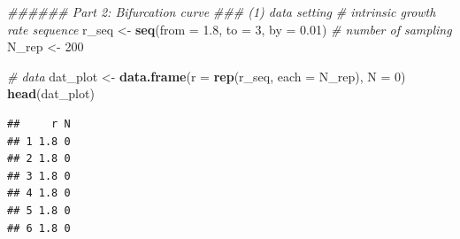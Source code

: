 \documentclass[
]{book}
\newenvironment{Shaded}{\begin{snugshade}}{\end{snugshade}}
\newcommand{\CommentTok}[1]{\textcolor[rgb]{0.56,0.35,0.01}{\textit{#1}}}
\newcommand{\DataTypeTok}[1]{\textcolor[rgb]{0.13,0.29,0.53}{#1}}
\newcommand{\DecValTok}[1]{\textcolor[rgb]{0.00,0.00,0.81}{#1}}
\newcommand{\FloatTok}[1]{\textcolor[rgb]{0.00,0.00,0.81}{#1}}
\newcommand{\KeywordTok}[1]{\textcolor[rgb]{0.13,0.29,0.53}{\textbf{#1}}}
\newcommand{\NormalTok}[1]{#1}
\newcommand{\StringTok}[1]{\textcolor[rgb]{0.31,0.60,0.02}{#1}}
\begin{document}
\begin{Shaded}
\begin{Highlighting}[]
\CommentTok{###### Part 2: Bifurcation curve}
\CommentTok{### (1) data setting}
\CommentTok{# intrinsic growth rate sequence}
\NormalTok{r_seq <-}\StringTok{ }\KeywordTok{seq}\NormalTok{(}\DataTypeTok{from =} \FloatTok{1.8}\NormalTok{, }\DataTypeTok{to =} \DecValTok{3}\NormalTok{, }\DataTypeTok{by =} \FloatTok{0.01}\NormalTok{)}
\CommentTok{# number of sampling}
\NormalTok{N_rep <-}\StringTok{ }\DecValTok{200}

\CommentTok{# data }
\NormalTok{dat_plot <-}\StringTok{ }\KeywordTok{data.frame}\NormalTok{(}\DataTypeTok{r =} \KeywordTok{rep}\NormalTok{(r_seq, }\DataTypeTok{each =}\NormalTok{ N_rep), }\DataTypeTok{N =} \DecValTok{0}\NormalTok{)}
\KeywordTok{head}\NormalTok{(dat_plot)}
\end{Highlighting}
\end{Shaded}

\begin{verbatim}
##     r N
## 1 1.8 0
## 2 1.8 0
## 3 1.8 0
## 4 1.8 0
## 5 1.8 0
## 6 1.8 0
\end{verbatim}
\end{document}
